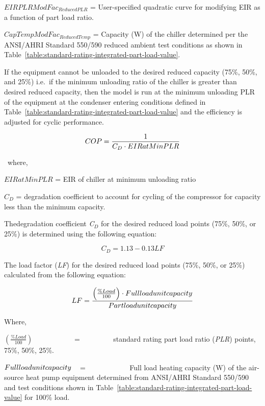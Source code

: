 \(EIRPLRModFa{c_{ReducedPLR}}\) = User-specified quadratic curve for modifying EIR as a function of part load ratio.

\(CapTempModFa{c_{ReducedTemp}}\) = Capacity (W) of the chiller determined per the ANSI/AHRI Standard 550/590 reduced ambient test conditions as shown in Table~\ref{table:standard-rating-integrated-part-load-value}.

If the equipment cannot be unloaded to the desired reduced capacity (75\%, 50\%, and 25\%) i.e.~if the minimum unloading ratio of the chiller is greater than desired reduced capacity, then the model is run at the minimum unloading PLR of the equipment at the condenser entering conditions defined in Table~\ref{table:standard-rating-integrated-part-load-value} and the efficiency is adjusted for cyclic performance.

\begin{equation}
COP = \frac{{\rm{1}}}{{{C_D} \cdot EIRatMinPLR}}
\end{equation}

~where,

\(EIRatMinPLR\) = EIR of chiller at minimum unloading ratio

\({C_D}\) = degradation coefficient to account for cycling of the compressor for capacity less than the minimum capacity.

Thedegradation coefficient \emph{C\(_{D}\)} for the desired reduced load points (75\%, 50\%, or 25\%) is determined using the following equation:

\begin{equation}
{C_D} = 1.13 - 0.13LF
\end{equation}

The load factor (\emph{LF}) for the desired reduced load points (75\%, 50\%, or 25\%) calculated from the following equation:

\begin{equation}
LF = \frac{{\left( {\frac{{\% Load}}{{100}}} \right) \cdot Full{\rm{ }}load{\rm{ }}unit{\rm{ }}capacity}}{{Part{\rm{ }}load{\rm{ }}unit{\rm{ }}capacity}}
\end{equation}

Where,

\emph{\(\left( {\frac{{\% Load}}{{100}}} \right)\)}~~~~~~~~~~~ = ~~~~~~~~ standard rating part load ratio (\emph{PLR}) points, 75\%, 50\%, 25\%.

\(Full{\rm{ }}load{\rm{ }}unit{\rm{ }}capacity\) ~ = ~~~~~~~~~~~ Full load heating capacity (W) of the air-source heat pump equipment determined from ANSI/AHRI Standard 550/590 and test conditions shown in Table~\ref{table:standard-rating-integrated-part-load-value} for 100\% load.

